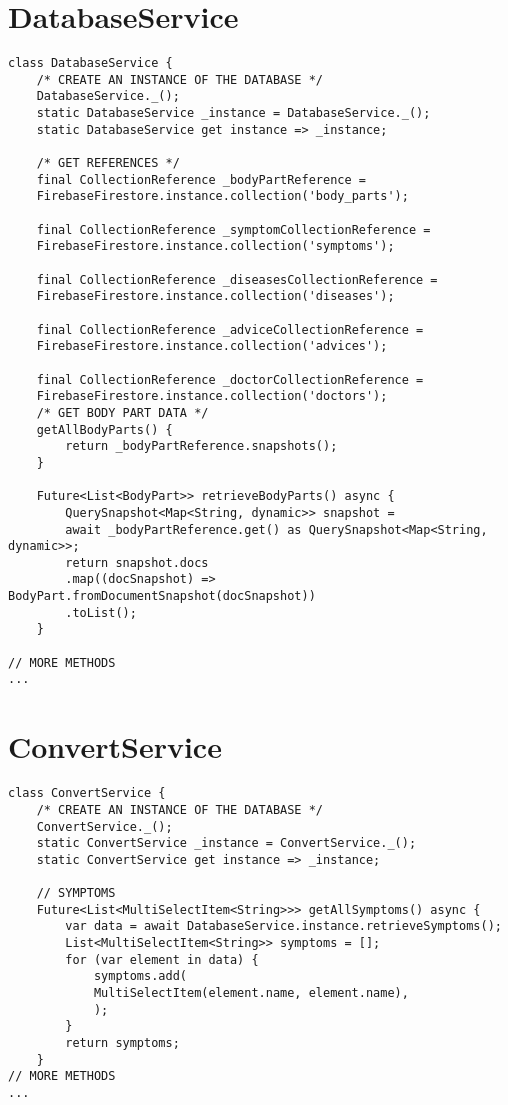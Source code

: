 \section{DatabaseService}
\begin{lstlisting}[caption=DatabaseService Code]
class DatabaseService {
	/* CREATE AN INSTANCE OF THE DATABASE */
	DatabaseService._();
	static DatabaseService _instance = DatabaseService._();
	static DatabaseService get instance => _instance;
	
	/* GET REFERENCES */
	final CollectionReference _bodyPartReference =
	FirebaseFirestore.instance.collection('body_parts');
	
	final CollectionReference _symptomCollectionReference =
	FirebaseFirestore.instance.collection('symptoms');
	
	final CollectionReference _diseasesCollectionReference =
	FirebaseFirestore.instance.collection('diseases');
	
	final CollectionReference _adviceCollectionReference =
	FirebaseFirestore.instance.collection('advices');
	
	final CollectionReference _doctorCollectionReference =
	FirebaseFirestore.instance.collection('doctors');
	/* GET BODY PART DATA */
	getAllBodyParts() {
		return _bodyPartReference.snapshots();
	}
	
	Future<List<BodyPart>> retrieveBodyParts() async {
		QuerySnapshot<Map<String, dynamic>> snapshot =
		await _bodyPartReference.get() as QuerySnapshot<Map<String, dynamic>>;
		return snapshot.docs
		.map((docSnapshot) => BodyPart.fromDocumentSnapshot(docSnapshot))
		.toList();
	}

// MORE METHODS 
...
\end{lstlisting}
\pagebreak
\section{ConvertService}
\begin{lstlisting}[caption=AppNavigator Class]
class ConvertService {
	/* CREATE AN INSTANCE OF THE DATABASE */
	ConvertService._();
	static ConvertService _instance = ConvertService._();
	static ConvertService get instance => _instance;
	
	// SYMPTOMS
	Future<List<MultiSelectItem<String>>> getAllSymptoms() async {
		var data = await DatabaseService.instance.retrieveSymptoms();
		List<MultiSelectItem<String>> symptoms = [];
		for (var element in data) {
			symptoms.add(
			MultiSelectItem(element.name, element.name),
			);
		}
		return symptoms;
	}
// MORE METHODS
...
\end{lstlisting}
\pagebreak
